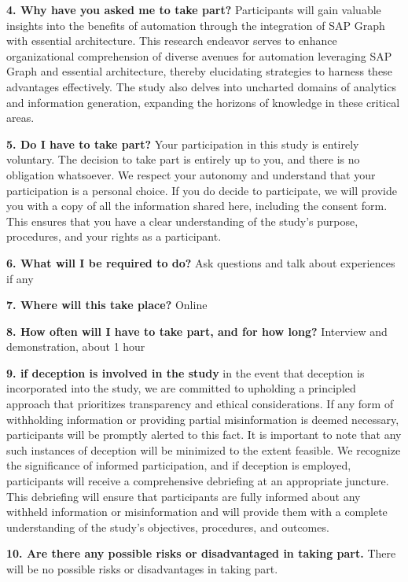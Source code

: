 \documentclass{article}
\begin{document}
\textbf{4.	Why have you asked me to take part?} Participants will gain valuable insights into the benefits of automation through the integration of SAP Graph with essential architecture. This research endeavor serves to enhance organizational comprehension of diverse avenues for automation leveraging SAP Graph and essential architecture, thereby elucidating strategies to harness these advantages effectively. The study also delves into uncharted domains of analytics and information generation, expanding the horizons of knowledge in these critical areas.

\textbf{5.	Do I have to take part?} Your participation in this study is entirely voluntary. The decision to take part is entirely up to you, and there is no obligation whatsoever. We respect your autonomy and understand that your participation is a personal choice. If you do decide to participate, we will provide you with a copy of all the information shared here, including the consent form. This ensures that you have a clear understanding of the study's purpose, procedures, and your rights as a participant.

\textbf{6.	What will I be required to do?} Ask questions and talk about experiences if any

\textbf{7.	Where will this take place?} Online

\textbf{8.	How often will I have to take part, and for how long?} Interview and demonstration, about 1 hour

\textbf{9. if deception is involved in the study} in the event that deception is incorporated into the study, we are committed to upholding a principled approach that prioritizes transparency and ethical considerations. If any form of withholding information or providing partial misinformation is deemed necessary, participants will be promptly alerted to this fact. It is important to note that any such instances of deception will be minimized to the extent feasible. We recognize the significance of informed participation, and if deception is employed, participants will receive a comprehensive debriefing at an appropriate juncture. This debriefing will ensure that participants are fully informed about any withheld information or misinformation and will provide them with a complete understanding of the study's objectives, procedures, and outcomes.

\textbf{10.	Are there any possible risks or disadvantaged in taking part.} There will be no possible risks or disadvantages in taking part.
\end{document}
